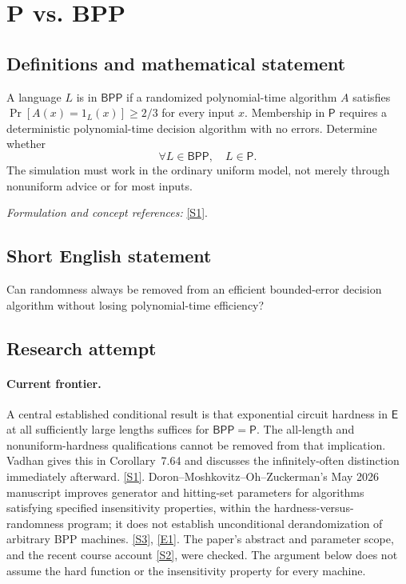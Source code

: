 \documentclass[11pt,a4paper]{article}
\newcommand{\sref}[2]{\hyperlink{source:#1:#2}{[S#2]}}
\newcommand{\eref}[2]{\hyperlink{extra:#1:#2}{[E#2]}}
\newif\ifshowcatalogue
\newcommand{\cataloguescope}[1]{\ifshowcatalogue
 \paragraph{Exact scope in the supplied catalogue.}
 \begin{quote}\small #1\end{quote}\fi}
\numberwithin{equation}{section}
\begin{document}
\setcounter{section}{0}
\clearpage
\section*{\texorpdfstring{P vs. BPP}{P vs. BPP}}\label{3405}
\subsection{Definitions and mathematical statement}
A language $L$ is in $\mathsf{BPP}$ if a randomized polynomial-time algorithm $A$ satisfies $\Pr[A(x)=1_L(x)]\ge2/3$ for every input $x$. Membership in $\mathsf P$ requires a deterministic polynomial-time decision algorithm with no errors. Determine whether
\[
 \forall L\in\mathsf{BPP},\quad L\in\mathsf P.
\]
The simulation must work in the ordinary uniform model, not merely through nonuniform advice or for most inputs.
\par\smallskip\textit{Formulation and concept references:} \sref{3405}{1}.
\cataloguescope{Determine whether every language computable by a probabilistic polynomial-time algorithm with bounded two-sided error (BPP) can be computed by a deterministic polynomial-time algorithm, i.e., whether BPP = P.}
\subsection{Short English statement}
Can randomness always be removed from an efficient bounded-error decision algorithm without losing polynomial-time efficiency?
\subsection{Research attempt}

\paragraph{Current frontier.}
A central established conditional result is that exponential circuit
hardness in $\mathsf E$ at all sufficiently large lengths suffices for
$\mathsf{BPP}=\mathsf P$. The all-length and nonuniform-hardness
qualifications cannot be removed from that implication. Vadhan gives
this in Corollary~7.64 and discusses the infinitely-often distinction
immediately afterward. \sref{3405}{1}. Doron--Moshkovitz--Oh--Zuckerman's
May 2026 manuscript improves generator and hitting-set parameters for
algorithms satisfying specified insensitivity properties, within the
hardness-versus-randomness program; it does not establish unconditional
derandomization of arbitrary BPP machines. \sref{3405}{3}, \eref{3405}{1}.
The paper's abstract and parameter scope, and the recent course account
\sref{3405}{2}, were checked. The argument below does not assume the hard
function or the insensitivity property for every machine.
\end{document}
